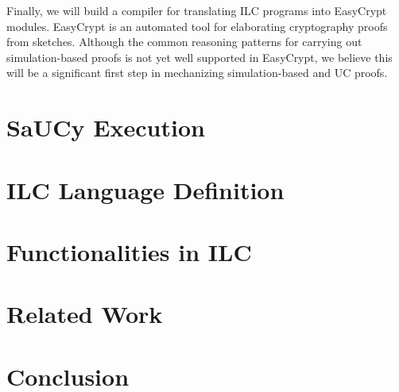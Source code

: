 \documentclass{llncs}
\begin{document}
Finally, we will build a compiler for translating ILC programs into
EasyCrypt~\cite{barthe2011computer} modules. EasyCrypt is an automated tool for
elaborating cryptography proofs from sketches. Although the common reasoning
patterns for carrying out simulation-based proofs is not yet well supported in
EasyCrypt, we believe this will be a significant first step in mechanizing
simulation-based and UC proofs.

\section{SaUCy Execution}



\section{ILC Language Definition}

\section{Functionalities in ILC}

\section{Related Work}

\section{Conclusion}




\appendix
\end{document}
